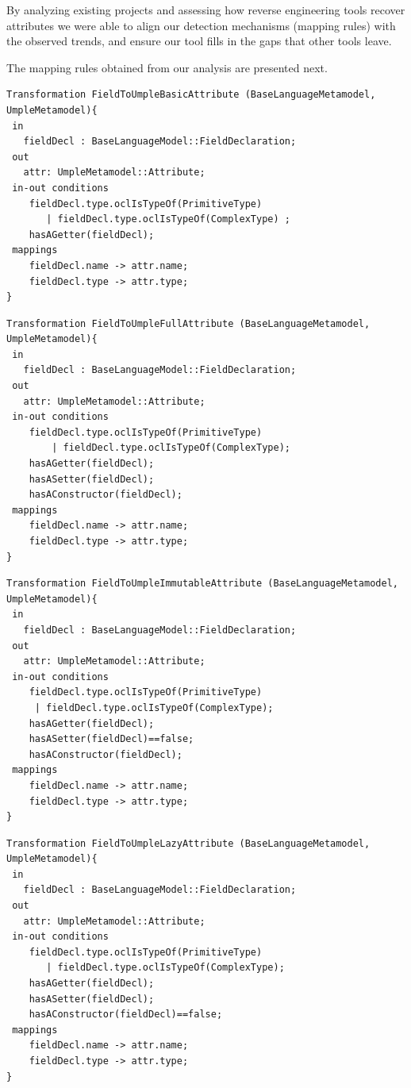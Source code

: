 By analyzing existing projects and assessing how reverse engineering tools recover attributes we were able to align our detection mechanisms (mapping rules) with the observed trends, and ensure our tool fills in the gaps that other tools leave.

The mapping rules obtained from our analysis are presented next.

\begin{lstlisting}[style=mine,caption=Case 1- Variable has a getter ,label=lst:attrCase1]
Transformation FieldToUmpleBasicAttribute (BaseLanguageMetamodel, UmpleMetamodel){ 
 in
   fieldDecl : BaseLanguageModel::FieldDeclaration;
 out
   attr: UmpleMetamodel::Attribute;
 in-out conditions
 	fieldDecl.type.oclIsTypeOf(PrimitiveType) 
 	   | fieldDecl.type.oclIsTypeOf(ComplexType) ;
 	hasAGetter(fieldDecl);
 mappings
    fieldDecl.name -> attr.name;
    fieldDecl.type -> attr.type;
}
\end{lstlisting}

\begin{lstlisting}[style=mine,caption=Is a Fully Editable Attribute,label=lst:attrCase2]
Transformation FieldToUmpleFullAttribute (BaseLanguageMetamodel, UmpleMetamodel){ 
 in
   fieldDecl : BaseLanguageModel::FieldDeclaration;
 out
   attr: UmpleMetamodel::Attribute;
 in-out conditions
 	fieldDecl.type.oclIsTypeOf(PrimitiveType)
 	    | fieldDecl.type.oclIsTypeOf(ComplexType);
 	hasAGetter(fieldDecl);
 	hasASetter(fieldDecl);
 	hasAConstructor(fieldDecl);
 mappings
    fieldDecl.name -> attr.name;
    fieldDecl.type -> attr.type;
}
\end{lstlisting}

\begin{lstlisting}[style=mine,caption=Is an Immutable Attribute,label=lst:attrCase3]
Transformation FieldToUmpleImmutableAttribute (BaseLanguageMetamodel, UmpleMetamodel){ 
 in
   fieldDecl : BaseLanguageModel::FieldDeclaration;
 out
   attr: UmpleMetamodel::Attribute;
 in-out conditions
 	fieldDecl.type.oclIsTypeOf(PrimitiveType)
 	 | fieldDecl.type.oclIsTypeOf(ComplexType);
 	hasAGetter(fieldDecl);
 	hasASetter(fieldDecl)==false;
 	hasAConstructor(fieldDecl);
 mappings
    fieldDecl.name -> attr.name;
    fieldDecl.type -> attr.type;
}
\end{lstlisting}

\begin{lstlisting}[style=mine,caption=Is a Lazy Attribute,label=lst:attrCase4]
Transformation FieldToUmpleLazyAttribute (BaseLanguageMetamodel, UmpleMetamodel){ 
 in
   fieldDecl : BaseLanguageModel::FieldDeclaration;
 out
   attr: UmpleMetamodel::Attribute;
 in-out conditions
 	fieldDecl.type.oclIsTypeOf(PrimitiveType)
 	   | fieldDecl.type.oclIsTypeOf(ComplexType);
 	hasAGetter(fieldDecl);
 	hasASetter(fieldDecl);
 	hasAConstructor(fieldDecl)==false;
 mappings
    fieldDecl.name -> attr.name;
    fieldDecl.type -> attr.type;
}
\end{lstlisting}

